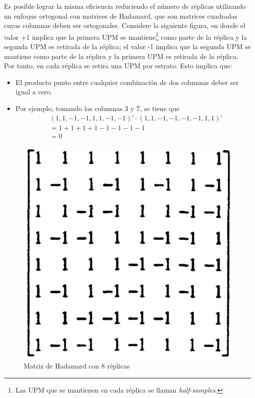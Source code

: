 \documentclass[
  10pt,
  spanish,
]{book}
\providecommand{\tightlist}{%
  \setlength{\itemsep}{0pt}\setlength{\parskip}{0pt}}
\begin{document}
Es posible lograr la misma eficiencia reduciendo el número de réplicas utilizando un enfoque ortogonal con matrices de Hadamard, que son matrices cuadradas cuyas columnas deben ser ortogonales. Considere la siguiente figura, en donde el valor +1 implica que la primera UPM se mantiene\footnote{Las UPM que se mantienen en cada réplica se llaman \emph{half-samples}.} como parte de la réplica y la segunda UPM es retirada de la réplica; el valor -1 implica que la segunda UPM se mantiene como parte de la réplica y la primera UPM es retirada de la réplica. Por tanto, en cada réplica se retira una UPM por estrato. Esto implica que:

\begin{itemize}
\tightlist
\item
  El producto punto entre cualquier combinación de dos columnas deber ser igual a cero.
\item
  Por ejemplo, tomando las columnas 3 y 7, se tiene que
  \begin{align*}
  &(1, 1, -1, -1, 1, 1, -1, -1)' \cdot (1, 1, -1,-1,-1,-1,1,1)'  \\ 
  &=  1 + 1 + 1 + 1 -1 - 1 - 1 -1  \\
  &=0 
  \end{align*}
\end{itemize}

\begin{figure}
\centering
\includegraphics{Pics/9.jpg}
\caption{Matriz de Hadamard con 8 réplicas}
\end{figure}
\end{document}
